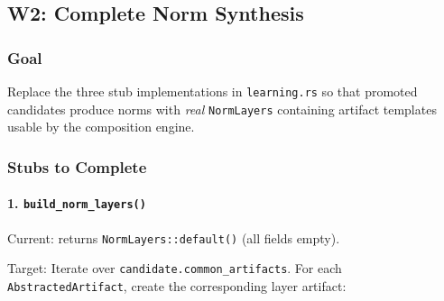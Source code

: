 \documentclass[11pt,a4paper]{article}
\begin{document}
\subsection{W2: Complete Norm Synthesis}
\label{sec:w2}

\subsubsection{Goal}

Replace the three stub implementations in \texttt{learning.rs} so that 
promoted candidates produce norms with \emph{real} \texttt{NormLayers} 
containing artifact templates usable by the composition engine.

\subsubsection{Stubs to Complete}

\paragraph{1. \texttt{build\_norm\_layers()}}

Current: returns \texttt{NormLayers::default()} (all fields empty).

Target: Iterate over \texttt{candidate.common\_artifacts}. For each 
\texttt{AbstractedArtifact}, create the corresponding layer artifact:
\end{document}
